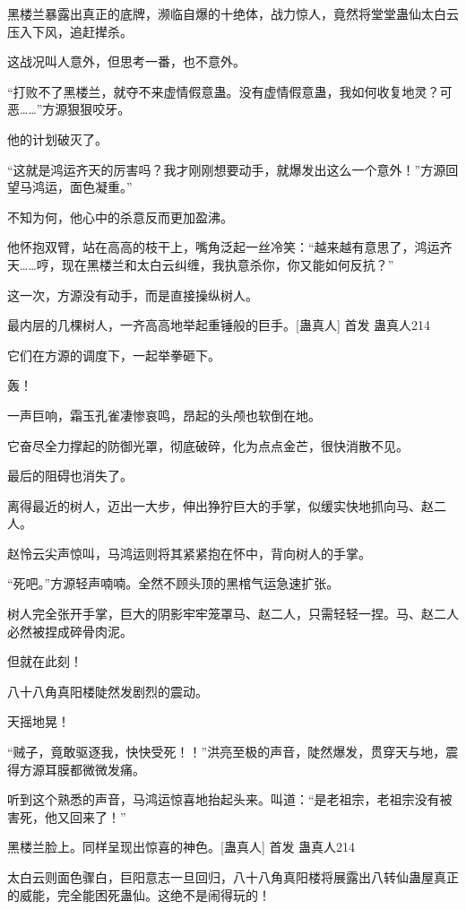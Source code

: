 
\begin{this_body}

黑楼兰暴露出真正的底牌，濒临自爆的十绝体，战力惊人，竟然将堂堂蛊仙太白云压入下风，追赶撵杀。

这战况叫人意外，但思考一番，也不意外。

“打败不了黑楼兰，就夺不来虚情假意蛊。没有虚情假意蛊，我如何收复地灵？可恶……”方源狠狠咬牙。

他的计划破灭了。

“这就是鸿运齐天的厉害吗？我才刚刚想要动手，就爆发出这么一个意外！”方源回望马鸿运，面色凝重。”

不知为何，他心中的杀意反而更加盈沸。

他怀抱双臂，站在高高的枝干上，嘴角泛起一丝冷笑：“越来越有意思了，鸿运齐天……哼，现在黑楼兰和太白云纠缠，我执意杀你，你又能如何反抗？”

这一次，方源没有动手，而是直接操纵树人。

最内层的几棵树人，一齐高高地举起重锤般的巨手。[蛊真人]  首发 蛊真人214

它们在方源的调度下，一起举拳砸下。

轰！

一声巨响，霜玉孔雀凄惨哀鸣，昂起的头颅也软倒在地。

它奋尽全力撑起的防御光罩，彻底破碎，化为点点金芒，很快消散不见。

最后的阻碍也消失了。

离得最近的树人，迈出一大步，伸出狰狞巨大的手掌，似缓实快地抓向马、赵二人。

赵怜云尖声惊叫，马鸿运则将其紧紧抱在怀中，背向树人的手掌。

“死吧。”方源轻声喃喃。全然不顾头顶的黑棺气运急速扩张。

树人完全张开手掌，巨大的阴影牢牢笼罩马、赵二人，只需轻轻一捏。马、赵二人必然被捏成碎骨肉泥。

但就在此刻！

八十八角真阳楼陡然发剧烈的震动。

天摇地晃！

“贼子，竟敢驱逐我，快快受死！！”洪亮至极的声音，陡然爆发，贯穿天与地，震得方源耳膜都微微发痛。

听到这个熟悉的声音，马鸿运惊喜地抬起头来。叫道：“是老祖宗，老祖宗没有被害死，他又回来了！”

黑楼兰脸上。同样呈现出惊喜的神色。[蛊真人]  首发 蛊真人214

太白云则面色骤白，巨阳意志一旦回归，八十八角真阳楼将展露出八转仙蛊屋真正的威能，完全能困死蛊仙。这绝不是闹得玩的！


\end{this_body}
